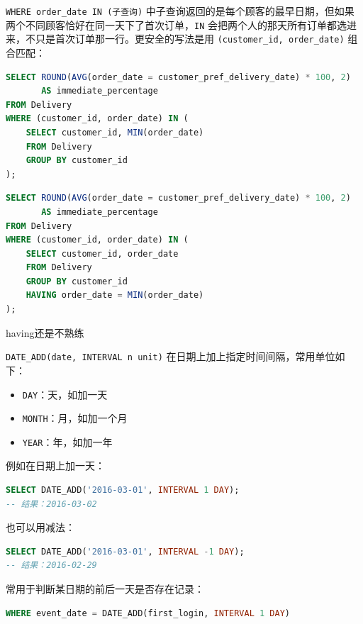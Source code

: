 \begin{homework}[1174 | 聚合函数 第7题]
\begin{note}
\texttt{WHERE order\_date IN (子查询)} 中子查询返回的是每个顾客的最早日期，但如果两个不同顾客恰好在同一天下了首次订单，\texttt{IN} 会把两个人的那天所有订单都选进来，不只是首次订单那一行。更安全的写法是用 \texttt{(customer\_id, order\_date)} 组合匹配：
\begin{lstlisting}[language=SQL]
SELECT ROUND(AVG(order_date = customer_pref_delivery_date) * 100, 2)
       AS immediate_percentage
FROM Delivery
WHERE (customer_id, order_date) IN (
    SELECT customer_id, MIN(order_date)
    FROM Delivery
    GROUP BY customer_id
);
\end{lstlisting}
\end{note}

\begin{lstlisting}[language=SQL]
SELECT ROUND(AVG(order_date = customer_pref_delivery_date) * 100, 2)
       AS immediate_percentage
FROM Delivery
WHERE (customer_id, order_date) IN (
    SELECT customer_id, order_date
    FROM Delivery
    GROUP BY customer_id
    HAVING order_date = MIN(order_date)
);
\end{lstlisting}
\begin{dxtips}
    having还是不熟练
\end{dxtips}
\end{homework}

\begin{definition}
\texttt{DATE\_ADD(date, INTERVAL n unit)} 在日期上加上指定时间间隔，常用单位如下：
\begin{itemize}
    \item \texttt{DAY}：天，如加一天
    \item \texttt{MONTH}：月，如加一个月
    \item \texttt{YEAR}：年，如加一年
\end{itemize}

\end{definition}

\begin{example}
    例如在日期上加一天：
\begin{lstlisting}[language=SQL]
SELECT DATE_ADD('2016-03-01', INTERVAL 1 DAY);
-- 结果：2016-03-02
\end{lstlisting}
也可以用减法：
\begin{lstlisting}[language=SQL]
SELECT DATE_ADD('2016-03-01', INTERVAL -1 DAY);
-- 结果：2016-02-29
\end{lstlisting}
常用于判断某日期的前后一天是否存在记录：
\begin{lstlisting}[language=SQL, backgroundcolor=\color{white}, frame=single]
WHERE event_date = DATE_ADD(first_login, INTERVAL 1 DAY)
\end{lstlisting}
\end{example}

